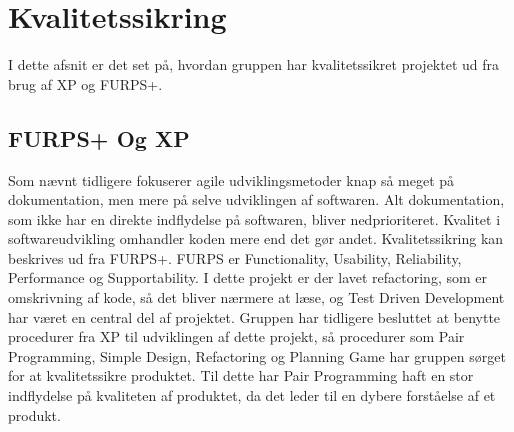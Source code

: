 \chapter{Kvalitetssikring}\label{ch:Kvalitetssikring}

I dette afsnit er det set på, hvordan gruppen har kvalitetssikret projektet ud fra brug af XP og FURPS+. 




\section{FURPS+ Og XP}


Som nævnt tidligere fokuserer agile udviklingsmetoder knap så meget på dokumentation, men mere på selve udviklingen af softwaren. Alt dokumentation, som ikke har en direkte indflydelse på softwaren, bliver nedprioriteret. Kvalitet i softwareudvikling omhandler koden mere end det gør andet. Kvalitetssikring kan beskrives ud fra FURPS+\cite{furps}. FURPS er Functionality, Usability, Reliability, Performance og Supportability. I dette projekt er der lavet refactoring, som er omskrivning af kode, så det bliver nærmere at læse, og Test Driven Development har været en central del af projektet. Gruppen har tidligere besluttet at benytte procedurer fra XP til udviklingen af dette projekt, så procedurer som Pair Programming, Simple Design, Refactoring og Planning Game har gruppen sørget for at kvalitetssikre produktet. Til dette har Pair Programming haft en stor indflydelse på kvaliteten af produktet, da det leder til en dybere forståelse af et produkt. \cite{Sommerville}





